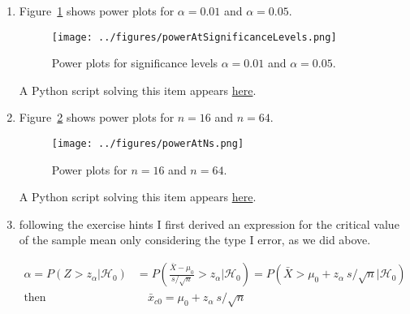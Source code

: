 \documentclass[12pt]{article}
\begin{document}
\begin{enumerate}
\begin{enumerate}
            \item Figure~\ref{fig:powerAtSignificanceLevels} shows power plots for
                $\alpha=0.01$ and $\alpha=0.05$.

                \begin{figure}
                    \begin{center}
                        \texttt{[image: ../figures/powerAtSignificanceLevels.png]}
                    \end{center}
                    \caption{Power plots for significance levels $\alpha=0.01$ and
                    $\alpha=0.05$.}
                    \label{fig:powerAtSignificanceLevels}
                \end{figure}

                A Python script solving this item appears
                \href{https://github.com/joacorapela/neuroinformatics24/blob/master/worksheets/01_tTestAndRandomizationTests/mySolution/code/doPowerExb.py}{here}.

            \item Figure~\ref{fig:powerAtNs} shows power plots for
                $n=16$ and $n=64$.

                \begin{figure}
                    \begin{center}
                        \texttt{[image: ../figures/powerAtNs.png]}
                    \end{center}
                    \caption{Power plots for $n=16$ and $n=64$.}
                    \label{fig:powerAtNs}
                \end{figure}

                A Python script solving this item appears
                \href{https://github.com/joacorapela/neuroinformatics24/blob/master/worksheets/01_tTestAndRandomizationTests/mySolution/code/doPowerExc.py}{here}.

            \item following the exercise hints I first derived an expression
                for the critical value of the sample mean only considering the
                type I error, as we did above.

                \begin{align}
                    \alpha=P(Z>z_\alpha|\mathcal{H}_0)&=P(\frac{\bar{X}-\mu_0}{s/\sqrt{n}}>z_\alpha|\mathcal{H}_0)=P(\bar{X}>\mu_0+z_\alpha\
                    s/\sqrt{n}|\mathcal{H}_0)\nonumber\\
                    \text{then}&\quad\bar{x}_{c0}=\mu_0+z_\alpha\ s/\sqrt{n}\label{eq:nullCritical}
                \end{align}


\end{enumerate}
\end{enumerate}
\end{document}
